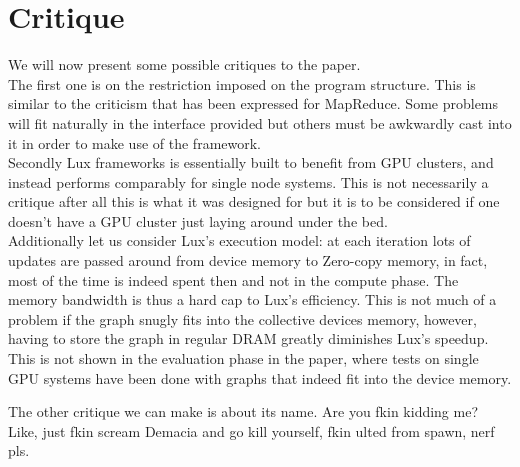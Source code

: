 \documentclass[]{article}
\begin{document}
\section{Critique}
We will now present some possible critiques to the paper.\\
The first one is on the restriction imposed on the program structure. This is similar to the criticism that has been expressed for MapReduce. Some problems will fit naturally in the interface provided but others must be awkwardly cast into it in order to make use of the framework.\\
Secondly Lux frameworks is essentially built to benefit from GPU clusters, and instead performs comparably for single node systems. This is not necessarily a critique after all this is what it was designed for but it is to be considered if one doesn't have a GPU cluster just laying around under the bed.\\
Additionally let us consider Lux's execution model: at each iteration lots of updates are passed around from device memory to Zero-copy memory, in fact, most of the time is indeed spent then and not in the compute phase. The memory bandwidth is thus a hard cap to Lux's efficiency. This is not much of a problem if the graph snugly fits into the collective devices memory, however, having to store the graph in regular DRAM greatly diminishes Lux's speedup. This is not shown in the evaluation phase in the paper, where tests on single GPU systems have been done with graphs that indeed fit into the device memory.

\noindent The other critique we can make is about its name. Are you fkin kidding me? Like, just fkin scream Demacia and go kill yourself, fkin ulted from spawn, nerf pls.
\end{document}
